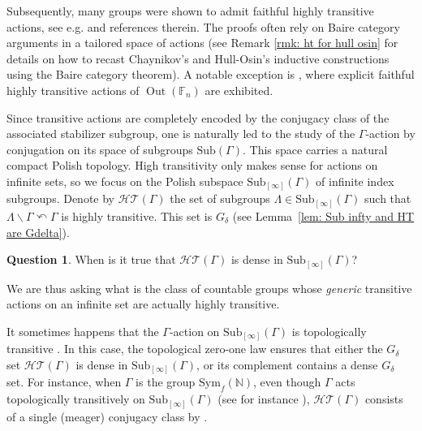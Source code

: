 \documentclass[12pt]{article}
\numberwithin{equation}{section}
\theoremstyle{definition}
\newtheorem{questionintro}{Question}
\newcommand{\N}{\mathbb{N}}
\newcommand{\Sym}{\mathrm{Sym}}
\newcommand{\Sub}{\mathrm{Sub}}
\newcommand{\bs}{\backslash}
\begin{document}
Subsequently, many groups were shown to admit faithful highly transitive actions, see e.g. 
\cite{chaynikov_properties_2012, kitroserHighlytransitiveActionsSurface2012, garionHighlyTransitiveActions2013, moonHighlyTransitiveActions2013, fima_highly_2015,
hullTransitivitydegreescountable2016, fima_characterization_HT_2022}
and references therein. The proofs often rely on Baire category arguments in a tailored space of actions
(see Remark \ref{rmk: ht for hull osin} for details on how to recast Chaynikov's and Hull-Osin's inductive constructions using the Baire category theorem). 
A notable exception is \cite{garionHighlyTransitiveActions2013},
where explicit faithful highly transitive actions of  $\operatorname{Out}(\mathbb F_n)$ are exhibited.


Since transitive actions are completely encoded by the conjugacy class of 
the associated stabilizer subgroup, one is naturally led to the study of the \(\Gamma\)-action by conjugation on its  
space of subgroups \(\Sub(\Gamma)\). This space carries a natural compact Polish topology. 
High transitivity only makes sense for actions on infinite sets, 
so we focus on the Polish subspace \(\Sub_{[\infty]}(\Gamma)\) of 
infinite index subgroups.
Denote by \(\mathcal{HT}(\Gamma)\) the set of subgroups \(\Lambda\in \Sub_{[\infty]}(\Gamma)\) such that \(\Lambda\bs\Gamma\curvearrowleft\Gamma\) is highly transitive. 
This set is \(G_\delta\) (see Lemma~\ref{lem: Sub infty and HT are Gdelta}).




\begin{questionintro}\label{qu: HT dense}
When is it true that
	\(\mathcal{HT}(\Gamma)\) is dense in \(\Sub_{[\infty]}(\Gamma)\)?
\end{questionintro}



We are thus asking what is the class of countable groups whose {\em generic}
transitive actions on an infinite set are actually highly transitive.




It sometimes happens that 
the \( \Gamma \)-action
on \(\Sub_{[\infty]}(\Gamma)\) is topologically transitive \cite{azuelosPerfectKernelDynamics2023}.
In this case, the topological zero-one law \cite[Theorem~8.46]{kechris_classical_1995} ensures that either the $G_\delta$ set
\(\mathcal{HT}(\Gamma)\)
is dense in \(\Sub_{[\infty]}(\Gamma)\), or its complement contains 
a dense \(G_\delta\) set. 
For instance, when \(\Gamma\) is the group \(\Sym_f(\N)\), 
even though \(\Gamma\) acts topologically transitively on \(\Sub_{[\infty]}(\Gamma)\) (see for instance \cite[Ex.~9.43 and Prop.~9.44]{le_maitre_polish_2024}), 
\(\mathcal{HT}(\Gamma)\) consists of a single (meager) conjugacy class 
by \cite[Prop.~2.4]{leboudecConfinedSubgroupsHigh2022}.
\end{document}
